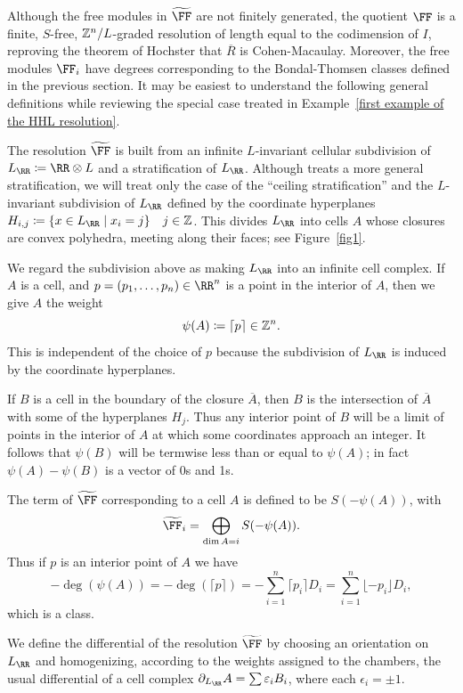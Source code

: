 \documentclass{amsart}
\begin{document}
Although the free modules in $\tF$ are not finitely generated, the quotient $\FF$
is a finite, $S$-free, $\mathbb Z^{n}/L$-graded resolution of length equal to the 
codimension of $I$, reproving the theorem of Hochster that
$\overline R$ is Cohen-Macaulay. Moreover, the free modules $\FF_{i}$ have degrees
corresponding to the Bondal-Thomsen classes defined in the previous section. It may be easiest to
understand the following general definitions while reviewing the special case treated in Example~\ref{first example of the HHL resolution}.


The resolution $\tF$ is built from an infinite $L$-invariant cellular subdivision of $L_\RR \ce \RR\otimes L$
and a stratification of $L_{\RR}$.  Although \cite{BCHS+25} treats a more general stratification, we will
treat only the case of  the ``ceiling stratification'' and the $L$-invariant subdivision of $L_\RR$ defined by the coordinate hyperplanes $H_{i,j}\ce \{x\in L_\RR\mid x_i = j\}\quad j\in \ZZ$. This divides $L_\RR$ into cells $A$ whose closures are convex polyhedra, meeting along their faces; see Figure~\ref{fig1}.

We regard the subdivision above as making $L_{\RR}$ into an infinite cell complex.
If $A$ is a cell, and $p = (p_1,\dots, p_n) \in \RR^n$ is a point in the
interior of $A$, then we give $A$ the weight
$$
\psi(A) \coloneqq \lceil p \rceil \in \mathbb Z^{n}.
$$
This is independent of the choice of $p$ because the subdivision of $L_\RR$ is induced by the coordinate hyperplanes.
 
If $B$ is 
a cell in the boundary of the closure $\overline A$, then $B$ is the intersection of
$\overline A$ with some of the hyperplanes $H_{j}$. Thus any interior point of $B$ will
be a limit of points in the interior of $A$ at which some coordinates approach an integer. It follows that
$\psi(B)$ will be termwise less than or equal to $\psi(A)$; in fact $\psi(A) - \psi(B)$ is a vector
of 0s and 1s.

\begin{defn}\label{def of F}
 The term of $\tF$ corresponding to a cell $A$ is defined to be $S(-\psi(A))$, with  
 \[
    \tF_i=\bigoplus_{\dim A=i}S(-\psi(A)).
   \]
Thus if $p$ is an interior point of $A$
we have
\[
-\deg(\psi(A)) = -\deg( \lceil {p}\rceil) = -\sum_{i=1}^n\lceil p_i\rceil D_i=\sum_{i=1}^n\lfloor -p_i\rfloor D_i,
\] 
which is a \BT class.

 We define the differential of the resolution $\tF$ by choosing
an orientation on $L_\RR$ and homogenizing, according to the weights assigned to the chambers, the usual differential of
a cell complex $\partial_{L_{\RR}}A = \sum\epsilon_{i}B_{i}$, where each $\epsilon_{i} = \pm 1$.
\end{defn}
\end{document}
